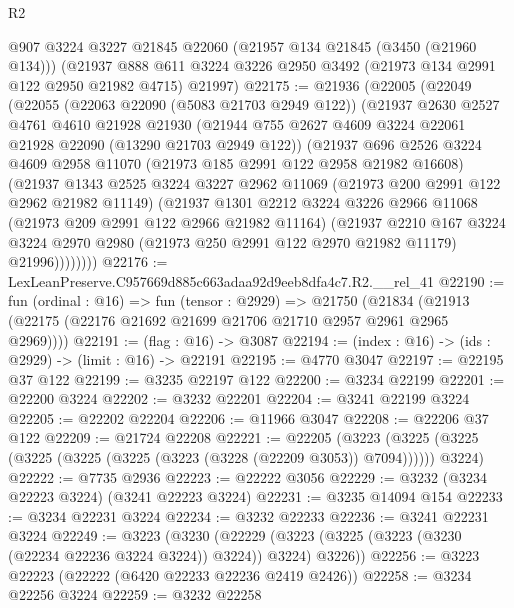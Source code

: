 \begin{lexlean}{R2}
\begin{coremodule}
    @907
    @3224
    @3227
    @21845
    @22060
    (@21957 @134 @21845 (@3450 (@21960 @134)))
    (@21937 @888 @611 @3224 @3226 @2950 @3492 (@21973 @134 @2991 @122 @2950 @21982 @4715) @21997)
@22175 := @21936
    (@22005
      (@22049
        (@22055
          (@22063 @22090 (@5083 @21703 @2949 @122))
          (@21937
            @2630
            @2527
            @4761
            @4610
            @21928
            @21930
            (@21944 @755 @2627 @4609 @3224 @22061 @21928 @22090 (@13290 @21703 @2949 @122))
            (@21937
              @696
              @2526
              @3224
              @4609
              @2958
              @11070
              (@21973 @185 @2991 @122 @2958 @21982 @16608)
              (@21937
                @1343
                @2525
                @3224
                @3227
                @2962
                @11069
                (@21973 @200 @2991 @122 @2962 @21982 @11149)
                (@21937
                  @1301
                  @2212
                  @3224
                  @3226
                  @2966
                  @11068
                  (@21973 @209 @2991 @122 @2966 @21982 @11164)
                  (@21937
                    @2210
                    @167
                    @3224
                    @3224
                    @2970
                    @2980
                    (@21973 @250 @2991 @122 @2970 @21982 @11179)
                    @21996))))))))
@22176 := LexLeanPreserve.C957669d885c663adaa92d9eeb8dfa4c7.R2.__rel_41
@22190 := fun (ordinal : @16) =>
  fun (tensor : @2929) =>
  @21750 (@21834 (@21913 (@22175 (@22176 @21692 @21699 @21706 @21710 @2957 @2961 @2965 @2969))))
@22191 := (flag : @16) -> @3087
@22194 := (index : @16) -> (ids : @2929) -> (limit : @16) -> @22191
@22195 := @4770 @3047
@22197 := @22195 @37 @122
@22199 := @3235 @22197 @122
@22200 := @3234 @22199
@22201 := @22200 @3224
@22202 := @3232 @22201
@22204 := @3241 @22199 @3224
@22205 := @22202 @22204
@22206 := @11966 @3047
@22208 := @22206 @37 @122
@22209 := @21724 @22208
@22221 := @22205
    (@3223 (@3225 (@3225 (@3225 (@3225 (@3225 (@3223 (@3228 (@22209 @3053)) @7094)))))) @3224)
@22222 := @7735 @2936
@22223 := @22222 @3056
@22229 := @3232 (@3234 @22223 @3224) (@3241 @22223 @3224)
@22231 := @3235 @14094 @154
@22233 := @3234 @22231 @3224
@22234 := @3232 @22233
@22236 := @3241 @22231 @3224
@22249 := @3223
    (@3230 (@22229 (@3223 (@3225 (@3223 (@3230 (@22234 @22236 @3224 @3224)) @3224)) @3224) @3226))
@22256 := @3223 @22223 (@22222 (@6420 @22233 @22236 @2419 @2426))
@22258 := @3234 @22256 @3224
@22259 := @3232 @22258

\end{coremodule}
\end{lexlean}
